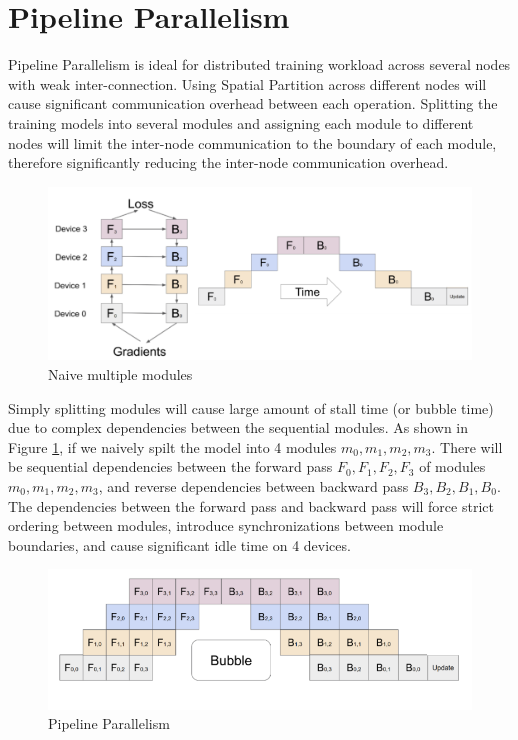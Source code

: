 \documentclass[sigplan, nonacm]{acmart}\settopmatter{printfolios=true,printccs=false,printacmref=false}
\begin{document}
 \section{Pipeline Parallelism} \label{pipelineparallism}
 Pipeline Parallelism is ideal for distributed training workload across several nodes with weak inter-connection. Using Spatial Partition across different nodes will cause significant communication overhead between each operation. Splitting the training models into several modules and assigning each module to different nodes will limit the inter-node communication to the boundary of each module, therefore significantly reducing the inter-node communication overhead.\par
 \begin{figure}[htbp]
  \centering
  \includegraphics[scale=0.3]{NormalPipeline}
  \caption{Naive multiple modules}
  \label{fig:multiplemodule}
\end{figure}
 Simply splitting modules will cause large amount of stall time (or bubble time) due to complex dependencies between the sequential modules. As shown in Figure \ref{fig:multiplemodule}, if we naively spilt the model into 4 modules $m_0,m_1,m_2,m_3$. There will be sequential dependencies between the forward pass $F_0, F_1, F_2, F_3$ of modules $m_0,m_1,m_2,m_3$, and reverse dependencies between backward pass $B_3, B_2, B_1, B_0$. The dependencies between the forward pass and backward pass will force strict ordering between modules, introduce synchronizations between module boundaries, and cause significant idle time on 4 devices. \par
 \begin{figure}[htbp]
  \centering
  \includegraphics[scale=0.4]{stackedpipeline}
  \caption{Pipeline Parallelism}
  \label{fig:stackedpipeline}
\end{figure}
\end{document}
